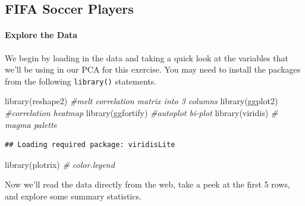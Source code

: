 \documentclass[
]{article}
\newenvironment{Shaded}{\begin{snugshade}}{\end{snugshade}}
\newcommand{\CommentTok}[1]{\textcolor[rgb]{0.56,0.35,0.01}{\textit{#1}}}
\newcommand{\FunctionTok}[1]{\textcolor[rgb]{0.00,0.00,0.00}{#1}}
\newcommand{\NormalTok}[1]{#1}
\theoremstyle{definition}
\theoremstyle{definition}
\theoremstyle{definition}
\theoremstyle{definition}
\theoremstyle{remark}
\begin{document}
\hypertarget{fifa-soccer-players}{%
\subsection{FIFA Soccer Players}\label{fifa-soccer-players}}

\hypertarget{explore-the-data-1}{%
\paragraph{Explore the Data}\label{explore-the-data-1}}

We begin by loading in the data and taking a quick look at the variables that we'll be using in our PCA for this exercise. You may need to install the packages from the following \texttt{library()} statements.

\begin{Shaded}
\begin{Highlighting}[]
\FunctionTok{library}\NormalTok{(reshape2) }\CommentTok{\#melt correlation matrix into 3 columns}
\FunctionTok{library}\NormalTok{(ggplot2) }\CommentTok{\#correlation heatmap}
\FunctionTok{library}\NormalTok{(ggfortify) }\CommentTok{\#autoplot bi{-}plot}
\FunctionTok{library}\NormalTok{(viridis) }\CommentTok{\# magma palette}
\end{Highlighting}
\end{Shaded}

\begin{verbatim}
## Loading required package: viridisLite
\end{verbatim}

\begin{Shaded}
\begin{Highlighting}[]
\FunctionTok{library}\NormalTok{(plotrix) }\CommentTok{\# color.legend}
\end{Highlighting}
\end{Shaded}

Now we'll read the data directly from the web, take a peek at the first 5 rows, and explore some summary statistics.
\end{document}
